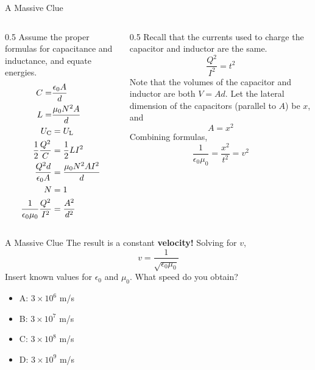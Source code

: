 \documentclass{beamer}
\begin{document}
\begin{frame}{A Massive Clue}
\small
\begin{columns}[T]
\begin{column}{0.5\textwidth}
Assume the proper formulas for capacitance and inductance, and equate energies.
\begin{align}
C =& \frac{\epsilon_0 A}{d} \\
L =& \frac{\mu_0 N^2 A}{d} \\
U_{\rm C} &= U_{\rm L} \\
\frac{1}{2}\frac{Q^2}{C} &= \frac{1}{2}LI^2 \\
\frac{Q^2 d}{\epsilon_0 A} &= \frac{\mu_0 N^2 A I^2}{d} \\
N &= 1 \\
\frac{1}{\epsilon_0 \mu_0} \frac{Q^2}{I^2} &= \frac{A^2}{d^2}
\end{align}
\end{column}
\begin{column}{0.5\textwidth}
Recall that the currents used to charge the capacitor and inductor are the same.
\begin{equation}
\frac{Q^2}{I^2} = t^2
\end{equation}
Note that the volumes of the capacitor and inductor are both $V = Ad$.  Let the lateral dimension of the capacitors (parallel to $A$) be $x$, and 
\begin{equation}
A = x^2
\end{equation}
Combining formulas,
\begin{equation}
\frac{1}{\epsilon_0 \mu_0} = \frac{x^2}{t^2} = v^2
\end{equation}
\end{column}
\end{columns}
\end{frame}

\begin{frame}{A Massive Clue}
\large
The result is a constant \textbf{\alert{velocity!}}  Solving for $v$,
\begin{equation}
\boxed{v = \frac{1}{\sqrt{\epsilon_0 \mu_0}}}
\end{equation}
Insert known values for $\epsilon_0$ and $\mu_0$.  What speed do you obtain?
\begin{itemize}
\item A: $3\times 10^{6}$ m/s
\item B: $3\times 10^{7}$ m/s
\item C: $3\times 10^{8}$ m/s
\item D: $3\times 10^{9}$ m/s
\end{itemize}
\end{frame}
\end{document}
